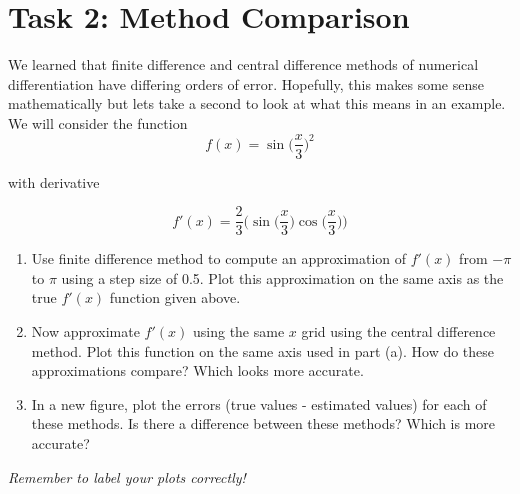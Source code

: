 \documentclass[11pt]{article}
\begin{document}
	\section*{Task 2: Method Comparison}
	\noindent We learned that finite difference and central difference methods of numerical differentiation have differing orders of error. Hopefully, this makes some sense mathematically but lets take a second to look at what this means in an example. We will consider the function \\
	\begin{equation*}
		f(x) = \sin\Big(\frac{x}{3}\Big)^2
	\end{equation*}
	\begin{center}
		with derivative
	\end{center}	
	\begin{equation*}
		f'(x) = \frac{2}{3}\bigg(\sin\Big(\frac{x}{3}\Big)\cos\Big(\frac{x}{3}\Big)\bigg)
	\end{equation*}
	\begin{enumerate}[label=\alph*)]
		\item Use finite difference method to compute an approximation of $f'(x)$ from $-\pi$ to $\pi$ using a step size of 0.5. Plot this approximation on the same axis as the true $f'(x)$ function given above.
		\item Now approximate $f'(x)$ using the same $x$ grid using the central difference method. Plot this function on the same axis used in part (a). How do these approximations compare? Which looks more accurate. 
		\item In a new figure, plot the errors (true values - estimated values) for each of these methods. Is there a difference between these methods? Which is more accurate? 
	\end{enumerate}

	\begin{center}
		\vfill
		\textit{Remember to label your plots correctly!}
	\end{center}
\end{document}
